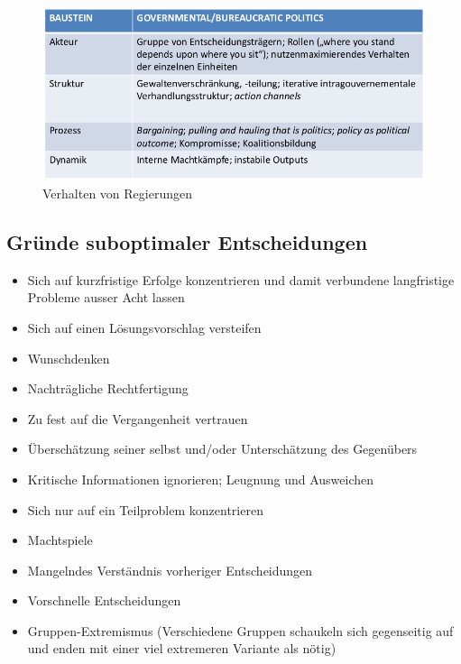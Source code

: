 \documentclass[a4paper, 11pt]{article}
\begin{document}
\begin{figure}[htb!]
	\centering
	\includegraphics[keepaspectratio=true,height=15\baselineskip]{governmentalactors.png}
	\caption{Verhalten von Regierungen}
	\label{fig:govtactors}
\end{figure}

\restoregeometry

\newpage

\subsection{Gründe suboptimaler Entscheidungen}

\begin{multicols}{2}
	\begin{itemize}
		\item Sich auf kurzfristige Erfolge konzentrieren und damit verbundene langfristige Probleme ausser Acht lassen
		\item Sich auf einen Lösungsvorschlag versteifen
		\item Wunschdenken
		\item Nachträgliche Rechtfertigung
		\item Zu fest auf die Vergangenheit vertrauen
		\item Überschätzung seiner selbst und/oder Unterschätzung des Gegenübers
	\columnbreak
		\item Kritische Informationen ignorieren; Leugnung und Ausweichen
		\item Sich nur auf ein Teilproblem konzentrieren
		\item Machtspiele
		\item Mangelndes Verständnis vorheriger Entscheidungen
		\item Vorschnelle Entscheidungen
		\item Gruppen-Extremismus (Verschiedene Gruppen schaukeln sich gegenseitig auf und enden mit einer viel extremeren Variante als nötig)
	\end{itemize}
\end{multicols}
\end{document}
